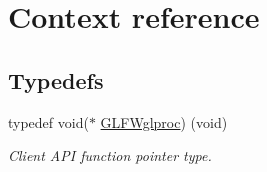 \hypertarget{group__context}{}\section{Context reference}
\label{group__context}
\subsection*{Typedefs}
\begin{DoxyCompactItemize}
\item 
typedef void($\ast$ \hyperlink{group__context_ga3d47c2d2fbe0be9c505d0e04e91a133c}{G\+L\+F\+Wglproc}) (void)
\begin{DoxyCompactList}\small\item\em Client A\+PI function pointer type. \end{DoxyCompactList}\end{DoxyCompactItemize}
